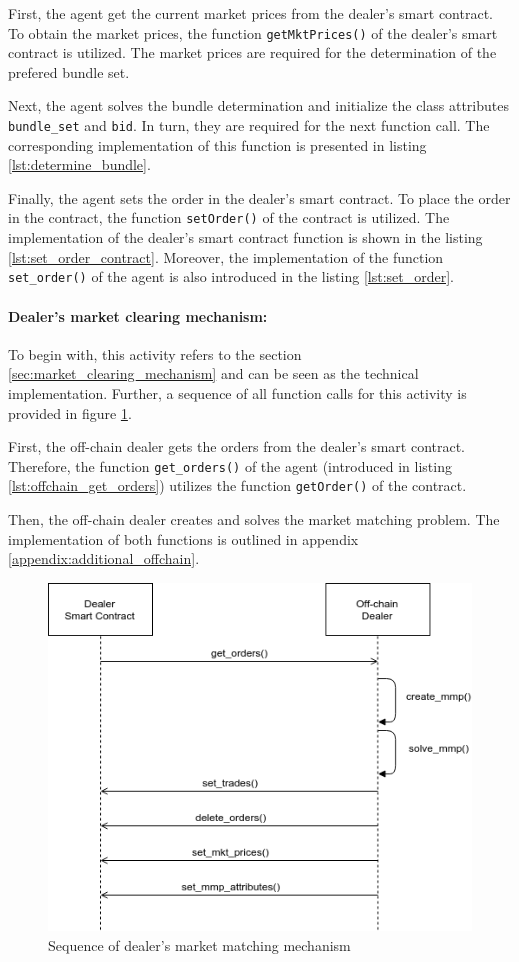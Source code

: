 First, the agent get the current market prices from the dealer's smart contract.
To obtain the market prices, the function \verb|getMktPrices()| of the dealer's smart contract is utilized.
The market prices are required for the determination of the prefered bundle set.

Next, the agent solves the bundle determination and initialize the class attributes
\verb|bundle_set| and \verb|bid|.
In turn, they are required for the next function call.
The corresponding implementation of this function is presented in listing \ref{lst:determine_bundle}.

Finally, the agent sets the order in the dealer's smart contract.
To place the order in the contract, the function \verb|setOrder()| of the contract is utilized.
The implementation of the dealer's smart contract function is shown in the listing \ref{lst:set_order_contract}.
Moreover, the implementation of the function \verb|set_order()| of the agent is 
also introduced in the listing \ref{lst:set_order}.

\paragraph{Dealer's market clearing mechanism:}
To begin with, this activity refers to the section \ref{sec:market_clearing_mechanism} and can be seen as
the technical implementation. Further, a sequence of all function 
calls for this activity is provided in figure \ref{figure:dealers_mmp}.

First, the off-chain dealer gets the orders from the dealer's smart contract.
Therefore, the function \verb|get_orders()| of the agent (introduced in listing \ref{lst:offchain_get_orders})
utilizes the function \verb|getOrder()| of the contract.

Then, the off-chain dealer creates and solves the market matching problem.
The implementation of both functions is outlined in appendix \ref{appendix:additional_offchain}.

\begin{figure}[htbp]
	\centering
	\includegraphics[width=.8\linewidth]{./figures/dealers_mmp.png}
	\caption{Sequence of dealer's market matching mechanism}
	\label{figure:dealers_mmp}
\end{figure}

